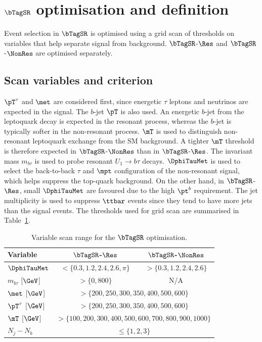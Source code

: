 \section[$\bTagSR$ optimisation and definition]{$\bTagSR$ optimisation and definition}
\label{sec:ch7_sr1b}

Event selection in $\bTagSR$ is optimised using a grid scan of thresholds on variables that help separate signal from background. $\bTagSR$-$\Res$ and $\bTagSR$-$\NonRes$ are optimised separately.

\subsection{Scan variables and criterion}
\label{subsec:ch7_scan}

$\pT^\tau$ and $\met$ are considered first, since energetic $\tau$ leptons and neutrinos are expected in the signal.
The $b$-jet $\pT$ is also used. An energetic $b$-jet from the leptoquark decay is expected in the resonant process, whereas the $b$-jet is typically softer in the non-resonant process. 
$\mT$ is used to distinguish non-resonant leptoquark exchange from the SM background.
A tighter $\mT$ threshold is therefore expected in $\bTagSR$-$\NonRes$ than in $\bTagSR$-$\Res$.
The invariant mass $m_{b\tau}$ is used to probe resonant $U_1\to b\tau$ decays.
$\DphiTauMet$ is used to select the back-to-back $\tau$ and $\mpt$ configuration of the non-resonant signal, which helps suppress the top-quark background.
On the other hand, in $\bTagSR$-$\Res$, small $\DphiTauMet$ are favoured due to the high $\pt^{b}$ requirement.
The jet multiplicity is used to suppress $\ttbar$ events since they tend to have more jets than the signal events.
The thresholds used for grid scan are summarised in Table~\ref{tab:ch7_scan_variables}.

\begin{table}[htbp]
    \centering
    \small
    \caption{Variable scan range for the $\bTagSR$ optimisation.}
    \label{tab:ch7_scan_variables}
    \begin{tabular}{lcc}
        \toprule
        Variable & $\bTagSR$-$\Res$ & $\bTagSR$-$\NonRes$ \\
        \midrule
        $\DphiTauMet$ & $<\{0.3,1.2,2.4,2.6,\pi\}$ & $>\{0.3,1.2,2.4,2.6\}$ \\
        $m_{b\tau}$ [$\GeV$] & $>\{0,800\}$ & N/A \\
        $\met$ [$\GeV$] & \multicolumn{2}{c}{$>\{200,250,300,350,400,500,600\}$} \\
        $\pT^\tau$ [$\GeV$] & \multicolumn{2}{c}{$>\{200,250,300,350,400,500,600\}$} \\
        $\mT$ [$\GeV$] & \multicolumn{2}{c}{$>\{100,200,300,400,500,600,700,800,900,1000\}$} \\
        $N_j-N_b$ & \multicolumn{2}{c}{$\leq\{1,2,3\}$} \\
        \bottomrule
    \end{tabular}
\end{table}

